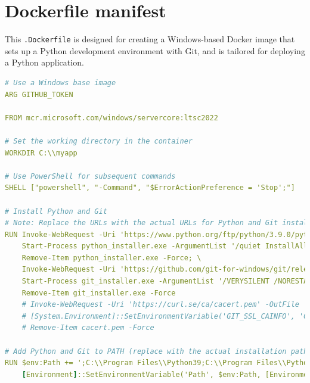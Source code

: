 \documentclass{article}
\begin{document}
\section{Dockerfile manifest} \label{dockerfile} 

This \texttt{.Dockerfile} is designed for creating a Windows-based Docker image that sets up a Python development environment with Git, and is tailored for deploying a Python application.

\begin{lstlisting}[language=yaml]
# Use a Windows base image
ARG GITHUB_TOKEN

FROM mcr.microsoft.com/windows/servercore:ltsc2022

# Set the working directory in the container
WORKDIR C:\\myapp

# Use PowerShell for subsequent commands
SHELL ["powershell", "-Command", "$ErrorActionPreference = 'Stop';"]

# Install Python and Git
# Note: Replace the URLs with the actual URLs for Python and Git installers
RUN Invoke-WebRequest -Uri 'https://www.python.org/ftp/python/3.9.0/python-3.9.0-amd64.exe' -OutFile 'python_installer.exe' -UseBasicParsing; \
    Start-Process python_installer.exe -ArgumentList '/quiet InstallAllUsers=1 PrependPath=1' -Wait; \
    Remove-Item python_installer.exe -Force; \
    Invoke-WebRequest -Uri 'https://github.com/git-for-windows/git/releases/download/v2.28.0.windows.1/Git-2.28.0-64-bit.exe' -OutFile 'git_installer.exe' -UseBasicParsing; \
    Start-Process git_installer.exe -ArgumentList '/VERYSILENT /NORESTART /NOCANCEL /SP-' -Wait; \
    Remove-Item git_installer.exe -Force
    # Invoke-WebRequest -Uri 'https://curl.se/ca/cacert.pem' -OutFile 'cacert.pem'; \
    # [System.Environment]::SetEnvironmentVariable('GIT_SSL_CAINFO', 'C:\codpy\cacert.pem', [System.EnvironmentVariableTarget]::Machine); \
    # Remove-Item cacert.pem -Force

# Add Python and Git to PATH (replace with the actual installation paths if different)
RUN $env:Path += ';C:\\Program Files\\Python39;C:\\Program Files\\Python39\\Scripts;C:\\Program Files\\Git\\cmd'; \
    [Environment]::SetEnvironmentVariable('Path', $env:Path, [EnvironmentVariableTarget]::Machine)


\end{lstlisting}
\end{document}
